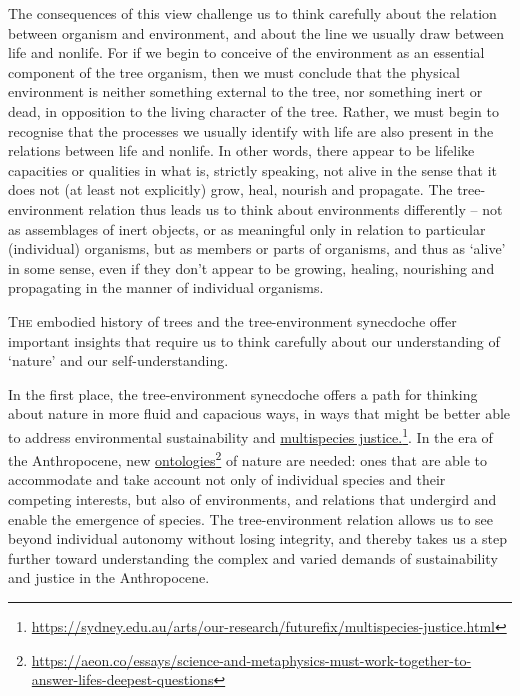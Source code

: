 \documentclass[../main.tex]{subfiles}
\begin{document}
\begin{multicols}{2}
{The consequences of this view challenge us to think carefully about the relation between organism and environment, and about the line we usually draw between life and nonlife. For if we begin to conceive of the environment as an essential component of the tree organism, then we must conclude that the physical environment is neither something external to the tree, nor something inert or dead, in opposition to the living character of the tree. Rather, we must begin to recognise that the processes we usually identify with life are also present in the relations between life and nonlife. In other words, there appear to be lifelike capacities or qualities in what is, strictly speaking, not alive in the sense that it does not (at least not explicitly) grow, heal, nourish and propagate. The tree-environment relation thus leads us to think about environments differently – not as assemblages of inert objects, or as meaningful only in relation to particular (individual) organisms, but as members or parts of organisms, and thus as ‘alive’ in some sense, even if they don’t appear to be growing, healing, nourishing and propagating in the manner of individual organisms. 

\lettrine{T}{he} embodied history of trees and the tree-environment synecdoche offer important insights that require us to think carefully about our understanding of ‘nature’ and our self-understanding. 

In the first place, the tree-environment synecdoche offers a path for thinking about nature in more fluid and capacious ways, in ways that might be better able to address environmental sustainability and \href{https://sydney.edu.au/arts/our-research/futurefix/multispecies-justice.html}{multispecies justice.}\footnote{\url{https://sydney.edu.au/arts/our-research/futurefix/multispecies-justice.html}}. In the era of the Anthropocene, new \href{https://aeon.co/essays/science-and-metaphysics-must-work-together-to-answer-lifes-deepest-questions}{ontologies}\footnote{\url{https://aeon.co/essays/science-and-metaphysics-must-work-together-to-answer-lifes-deepest-questions}} of nature are needed: ones that are able to accommodate and take account not only of individual species and their competing interests, but also of environments, and relations that undergird and enable the emergence of species. The tree-environment relation allows us to see beyond individual autonomy without losing integrity, and thereby takes us a step further toward understanding the complex and varied demands of sustainability and justice in the Anthropocene. 

}
\end{multicols}
\end{document}

